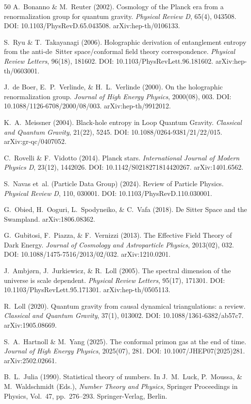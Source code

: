 \documentclass[aps,prd,twocolumn,superscriptaddress,nofootinbib]{revtex4-2}
\begin{document}
\begin{thebibliography}{50}
A.~Bonanno \& M.~Reuter (2002).
Cosmology of the Planck era from a renormalization group for quantum gravity.
\textit{Physical Review D}, 65(4), 043508.
DOI: 10.1103/PhysRevD.65.043508.
arXiv:hep-th/0106133.

S.~Ryu \& T.~Takayanagi (2006).
Holographic derivation of entanglement entropy from the anti-de~Sitter space/conformal field theory correspondence.
\textit{Physical Review Letters}, 96(18), 181602.
DOI: 10.1103/PhysRevLett.96.181602.
arXiv:hep-th/0603001.

J.~de Boer, E.~P.~Verlinde, \& H.~L.~Verlinde (2000).
On the holographic renormalization group.
\textit{Journal of High Energy Physics}, 2000(08), 003.
DOI: 10.1088/1126-6708/2000/08/003.
arXiv:hep-th/9912012.


K.~A.~Meissner (2004).
Black-hole entropy in Loop Quantum Gravity.
\textit{Classical and Quantum Gravity}, 21(22), 5245.
DOI: 10.1088/0264-9381/21/22/015.
arXiv:gr-qc/0407052.

C.~Rovelli \& F.~Vidotto (2014).
Planck stars.
\textit{International Journal of Modern Physics D}, 23(12), 1442026.
DOI: 10.1142/S0218271814420267.
arXiv:1401.6562.

S.~Navas et~al. (Particle Data Group) (2024).
Review of Particle Physics.
\textit{Physical Review D}, 110, 030001.
DOI: 10.1103/PhysRevD.110.030001.

G.~Obied, H.~Ooguri, L.~Spodyneiko, \& C.~Vafa (2018).
De Sitter Space and the Swampland.
arXiv:1806.08362.

G.~Gubitosi, F.~Piazza, \& F.~Vernizzi (2013).
The Effective Field Theory of Dark Energy.
\textit{Journal of Cosmology and Astroparticle Physics}, 2013(02), 032.
DOI: 10.1088/1475-7516/2013/02/032.
arXiv:1210.0201.

J.~Ambj\o{}rn, J.~Jurkiewicz, \& R.~Loll (2005).
The spectral dimension of the universe is scale dependent.
\textit{Physical Review Letters}, 95(17), 171301.
DOI: 10.1103/PhysRevLett.95.171301.
arXiv:hep-th/0505113.

R.~Loll (2020).
Quantum gravity from causal dynamical triangulations: a review.
\textit{Classical and Quantum Gravity}, 37(1), 013002.
DOI: 10.1088/1361-6382/ab57c7.
arXiv:1905.08669.

S.~A.~Hartnoll \& M.~Yang (2025).
The conformal primon gas at the end of time.
\textit{Journal of High Energy Physics}, 2025(07), 281.
DOI: 10.1007/JHEP07(2025)281.
arXiv:2502.02661.

B.~L.~Julia (1990).
Statistical theory of numbers.
In J.~M.~Luck, P.~Moussa, \& M.~Waldschmidt (Eds.), \textit{Number Theory and Physics},
Springer Proceedings in Physics, Vol.~47, pp.\ 276--293.
Springer-Verlag, Berlin.

\end{thebibliography}
\end{document}
